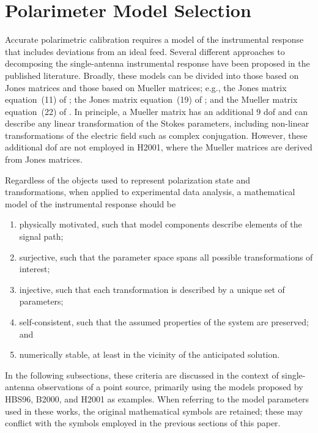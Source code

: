 \section{ Polarimeter Model Selection }
\label{sec:selection}


Accurate polarimetric calibration requires a 
model of the instrumental response that includes deviations from an ideal feed.
%
Several different approaches to decomposing the single-antenna
instrumental response have been proposed in the published literature.
%
Broadly, these models can be divided into those based on Jones matrices and
those based on Mueller matrices; e.g., 
the Jones matrix equation~(11) of \citet[][hereafter HBS96]{hbs96};
the Jones matrix equation~(19) of \citet[][hereafter B2000]{bri00}; and
the Mueller matrix equation~(22) of \citet[][hereafter H2001]{hpn+01}.
%
%
In principle, a Mueller matrix has an additional 9 dof and can describe any linear transformation of the Stokes parameters, including non-linear transformations
of the electric field such as complex conjugation.  However, these additional dof are not employed in H2001, where the Mueller matrices are derived from Jones matrices.

Regardless of the objects used to represent polarization state and transformations,
when applied to experimental data analysis, a mathematical model of the 
instrumental response should be
%
\begin{enumerate}
        \item physically motivated, such that model components describe elements of the signal path;
	\item surjective, such that the parameter space spans all possible transformations of interest;
        \item injective, such that each transformation is described by a unique set of parameters;
	\item self-consistent, such that the assumed properties of the system are preserved; and
	\item numerically stable, at least in the vicinity of the anticipated solution.
\end{enumerate}

In the following subsections, these criteria are discussed in the context of
single-antenna observations of a point source, primarily using the models proposed by 
HBS96, B2000, and H2001 as examples.
%
When referring to the model parameters used in these works, 
the original mathematical symbols are retained;
these may conflict with the symbols employed in the previous
sections of this paper.


